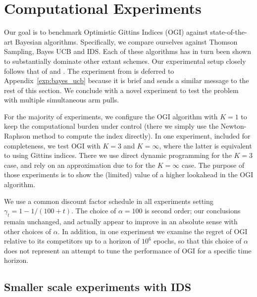 \section{Computational Experiments} \label{sec:experiments}
Our goal is to benchmark Optimistic Gittins Indices (OGI) against state-of-the-art Bayesian algorithms. Specifically, we compare ourselves against Thomson Sampling, Bayes UCB and IDS. Each of these algorithms has in turn been shown to substantially dominate other extant schemes. Our experimental setup closely follows that of \cite{russo2014learning,kaufmann2012bayesian} and \cite{chapelle2011empirical}. 
The experiment from \cite{kaufmann2012bayesian} is deferred to Appendix~\ref{exp:bayes_ucb} because it is brief and sends a similar message to the rest of this section. We conclude with a novel experiment to test the problem with multiple simultaneous arm pulls.

For the majority of experiments, we configure the OGI algorithm with $K =1$ to keep the computational burden under control {(there we simply use the Newton-Raphson method to compute the index directly)}. In one experiment, included for completeness, we test OGI with $K = 3$ and $K=\infty$, where the latter is equivalent to using Gittins indices. {There we use direct dynamic programming for the $K=3$ case, and rely on an approximation due to \cite{powell2012optimal} for the $K=\infty$ case.} The purpose of those experiments is to show the (limited) value of a higher lookahead in the OGI algorithm. 

We use a common discount factor schedule in all experiments setting $\gamma_t = 1 - 1/(100 + t)$. The choice of $\alpha = 100$ is second order; our conclusions remain unchanged, and actually appear to improve in an absolute sense with other choices of $\alpha$. In addition, in one experiment we examine the regret of OGI relative to its competitors up to a horizon of $10^6$ epochs, so that this choice of $\alpha$ does not represent an attempt to tune the performance of OGI for a specific time horizon. 



\subsection{Smaller scale experiments with IDS}

